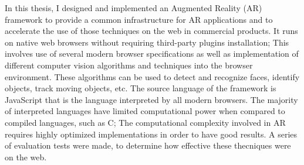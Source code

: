 In this thesis, I designed and implemented an Augmented Reality (AR) framework
to provide a common infrastructure for AR applications and to accelerate the use
of those techniques on the web in commercial products.   It runs on native web
browsers without requiring third-party plugins installation; This involves use
of several modern browser specifications as well as implementation
of different computer vision algorithms and techniques into the browser environment.
These algorithms can be used to detect and recognize faces, identify objects,
track moving objects, etc.  The source language of the framework is JavaScript
that is the language interpreted by all modern browsers.   The majority of
interpreted languages have limited computational power when compared to compiled
languages, such as C; The computational complexity involved in AR requires highly
optimized implementations in order to have good results.  A series of evaluation
tests were made, to determine how effective these thecniques were on the web.


